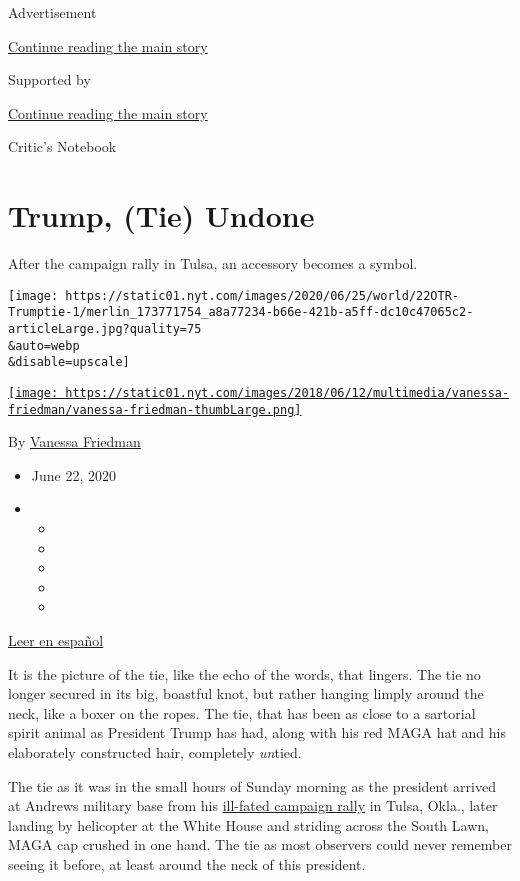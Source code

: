 Advertisement

\protect\hyperlink{after-top}{Continue reading the main story}

Supported by

\protect\hyperlink{after-sponsor}{Continue reading the main story}

Critic's Notebook

\hypertarget{trump-tie-undone}{%
\section{Trump, (Tie) Undone}\label{trump-tie-undone}}

After the campaign rally in Tulsa, an accessory becomes a symbol.

\texttt{[image: https://static01.nyt.com/images/2020/06/25/world/22OTR-Trumptie-1/merlin\_173771754\_a8a77234-b66e-421b-a5ff-dc10c47065c2-articleLarge.jpg?quality=75\\\&auto=webp\\\&disable=upscale]}

\href{https://www.nytimes.com/by/vanessa-friedman}{\texttt{[image: https://static01.nyt.com/images/2018/06/12/multimedia/vanessa-friedman/vanessa-friedman-thumbLarge.png]}}

By \href{https://www.nytimes.com/by/vanessa-friedman}{Vanessa Friedman}

\begin{itemize}
\item
  June 22, 2020
\item
  \begin{itemize}
  \item
  \item
  \item
  \item
  \item
  \end{itemize}
\end{itemize}

\href{https://www.nytimes.com/es/2020/06/24/espanol/mundo/trump-tulsa-foto-corbata.html}{Leer
en español}

It is the picture of the tie, like the echo of the words, that lingers.
The tie no longer secured in its big, boastful knot, but rather hanging
limply around the neck, like a boxer on the ropes. The tie, that has
been as close to a sartorial spirit animal as President Trump has had,
along with his red MAGA hat and his elaborately constructed hair,
completely \emph{un}tied.

The tie as it was in the small hours of Sunday morning as the president
arrived at Andrews military base from his
\href{https://www.nytimes.com/2020/06/21/us/politics/trump-tulsa-rally.html}{ill-fated
campaign rally} in Tulsa, Okla., later landing by helicopter at the
White House and striding across the South Lawn, MAGA cap crushed in one
hand. The tie as most observers could never remember seeing it before,
at least around the neck of this president.

